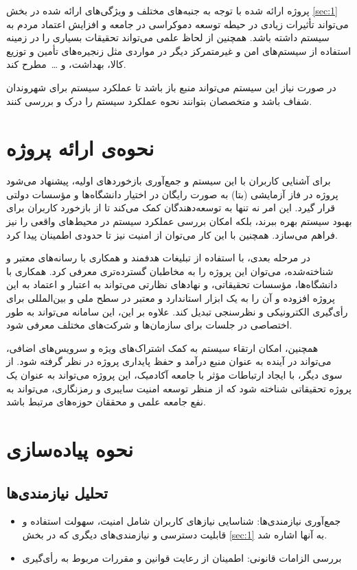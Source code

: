 \documentclass[12pt]{article}
\begin{document}
پروژه ارائه شده با توجه به جنبه‌های مختلف و ویژگی‌های ارائه شده در بخش 
\ref{sec:1}
می‌تواند تأثیرات زیادی در حیطه توسعه دموکراسی در جامعه و افزایش اعتماد مردم به سیستم داشته باشد. همچنین از لحاظ علمی می‌تواند تحقیقات بسیاری را در زمینه استفاده از سیستم‌های امن و غیرمتمرکز دیگر در مواردی مثل زنجیره‌های تأمین و توزیع کالا، بهداشت، و  \ldots\  مطرح کند. 


در صورت نیاز این سیستم می‌تواند منبع باز باشد تا عملکرد سیستم برای شهروندان شفاف باشد و متخصصان بتوانند نحوه عملکرد سیستم را درک و بررسی کنند.

\section{نحوه‌ی ارائه پروژه}
برای آشنایی کاربران با این سیستم و جمع‌آوری بازخوردهای اولیه، پیشنهاد می‌شود پروژه در فاز آزمایشی (بتا) به صورت رایگان در اختیار دانشگاه‌ها و مؤسسات دولتی قرار گیرد. این امر نه تنها به توسعه‌دهندگان کمک می‌کند تا از بازخورد کاربران برای بهبود سیستم بهره ببرند، بلکه امکان بررسی عملکرد سیستم در محیط‌های واقعی را نیز فراهم می‌سازد. همچنین با این کار می‌توان از امنیت  نیز تا حدودی اطمینان پیدا کرد.


در مرحله بعدی، با استفاده از تبلیغات هدفمند و همکاری با رسانه‌های معتبر و شناخته‌شده، می‌توان این پروژه را به مخاطبان گسترده‌تری معرفی کرد. همکاری با دانشگاه‌ها، مؤسسات تحقیقاتی، و نهادهای نظارتی می‌تواند به اعتبار و اعتماد به این پروژه افزوده و آن را به یک ابزار استاندارد و معتبر در سطح ملی و بین‌المللی برای رأی‌گیری الکترونیکی و نظرسنجی تبدیل کند. علاوه بر این، این سامانه می‌تواند به طور اختصاصی در جلسات برای سازمان‌ها و شرکت‌های مختلف معرفی شود. 


همچنین، امکان ارتقاء سیستم به کمک اشتراک‌های ویژه و سرویس‌های اضافی، می‌تواند در آینده به عنوان منبع درآمد و حفظ پایداری پروژه در نظر گرفته شود. از سوی دیگر، با ایجاد ارتباطات مؤثر با جامعه آکادمیک، این پروژه می‌تواند به عنوان یک پروژه تحقیقاتی شناخته شود که از منظر توسعه امنیت سایبری و رمزنگاری، می‌تواند به نفع جامعه علمی و محققان حوزه‌های مرتبط باشد.






\section{نحوه پیاده‌سازی}


\subsection{تحلیل نیازمندی‌ها}
\begin{itemize}
\item
جمع‌آوری نیازمندی‌ها: شناسایی نیازهای کاربران شامل امنیت، سهولت استفاده و قابلیت دسترسی و نیازمندی‌های دیگری که در بخش 
\ref{sec:1}
به آنها اشاره شد. 
\item
بررسی الزامات قانونی: اطمینان از رعایت قوانین و مقررات مربوط به رأی‌گیری
\end{itemize}
\end{document}
